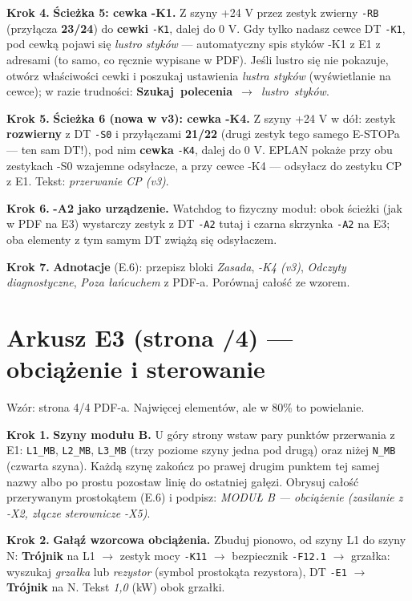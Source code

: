 \documentclass[11pt,a4paper]{article}
\newcommand{\ui}[1]{\textbf{#1}}                    %
\newcommand{\szukaj}[1]{\mbox{\ui{Szukaj polecenia} $\to$ \emph{#1}}} %
\newcommand{\krok}[1]{\par\medskip\noindent\textbf{\color{granat}Krok #1.}\space}
\begin{document}
\krok{4} \textbf{Ścieżka 5: cewka -K1.} Z szyny +24 V przez zestyk zwierny \texttt{-RB}
(przyłącza \textbf{23/24}) do \textbf{cewki} \texttt{-K1}, dalej do 0 V. Gdy tylko nadasz cewce
DT \texttt{-K1}, pod cewką pojawi się \emph{lustro styków} --- automatyczny spis styków -K1
z E1 z adresami (to samo, co ręcznie wypisane w PDF). Jeśli lustro się nie pokazuje, otwórz
właściwości cewki i poszukaj ustawienia \emph{lustra styków} (wyświetlanie na cewce);
w razie trudności: \szukaj{lustro styków}.

\krok{5} \textbf{Ścieżka 6 (nowa w v3): cewka -K4.} Z szyny +24 V w dół: zestyk
\textbf{rozwierny} z DT \texttt{-S0} i przyłączami \textbf{21/22} (drugi zestyk tego samego
E-STOPa --- ten sam DT!), pod nim \textbf{cewka} \texttt{-K4}, dalej do 0 V. EPLAN pokaże przy
obu zestykach -S0 wzajemne odsyłacze, a przy cewce -K4 --- odsyłacz do zestyku CP z E1.
Tekst: \emph{przerwanie CP (v3)}.

\krok{6} \textbf{-A2 jako urządzenie.} Watchdog to fizyczny moduł: obok ścieżki (jak w PDF na E3)
wystarczy zestyk z DT \texttt{-A2} tutaj i czarna skrzynka \texttt{-A2} na E3; oba elementy
z tym samym DT zwiążą się odsyłaczem.

\krok{7} \textbf{Adnotacje} (E.6): przepisz bloki \emph{Zasada}, \emph{-K4 (v3)},
\emph{Odczyty diagnostyczne}, \emph{Poza łańcuchem} z PDF-a. Porównaj całość ze wzorem.

\section{Arkusz E3 (strona /4) --- obciążenie i sterowanie}
\label{sec:e3g}

Wzór: strona 4/4 PDF-a. Najwięcej elementów, ale w 80\% to powielanie.

\krok{1} \textbf{Szyny modułu B.} U góry strony wstaw pary punktów przerwania z E1:
\texttt{L1\_MB}, \texttt{L2\_MB}, \texttt{L3\_MB} (trzy poziome szyny jedna pod drugą)
oraz niżej \texttt{N\_MB} (czwarta szyna). Każdą szynę zakończ po prawej drugim punktem tej
samej nazwy albo po prostu pozostaw linię do ostatniej gałęzi. Obrysuj całość przerywanym
prostokątem (E.6) i podpisz: \emph{MODUŁ B --- obciążenie (zasilanie z -X2, złącze sterownicze
-X5)}.

\krok{2} \textbf{Gałąź wzorcowa obciążenia.} Zbuduj pionowo, od szyny L1 do szyny N:
\ui{Trójnik} na L1 $\to$ zestyk mocy \texttt{-K11} $\to$ bezpiecznik \texttt{-F12.1} $\to$
grzałka: wyszukaj \emph{grzałka} lub \emph{rezystor} (symbol prostokąta rezystora), DT
\texttt{-E1} $\to$ \ui{Trójnik} na N. Tekst \emph{1,0} (kW) obok grzałki.
\end{document}
